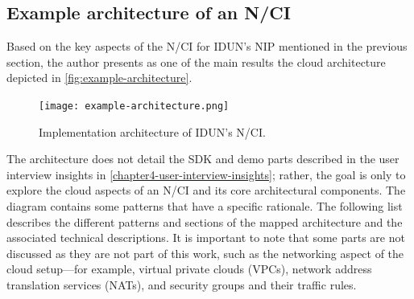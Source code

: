 \subsection{Example architecture of an N/CI}
\label{chapter5-example-architecture-of-an-nci}

Based on the key aspects of the N/CI for IDUN’s NIP mentioned in the previous section, the author presents as one of the main results the cloud architecture depicted in \autoref{fig:example-architecture}.

\begin{figure}[!ht]
  \centering
  \texttt{[image: example-architecture.png]}
  \caption{Implementation architecture of IDUN’s N/CI.}
  \label{fig:example-architecture}
\end{figure}

The architecture does not detail the SDK and demo parts described in the user interview insights in \autoref{chapter4-user-interview-insights}; rather, the goal is only to explore the cloud aspects of an N/CI and its core architectural components. The diagram contains some patterns that have a specific rationale. The following list describes the different patterns and sections of the mapped architecture and the associated technical descriptions. It is important to note that some parts are not discussed as they are not part of this work, such as the networking aspect of the cloud setup—for example, virtual private clouds (VPCs), network address translation services (NATs), and security groups and their traffic rules.

